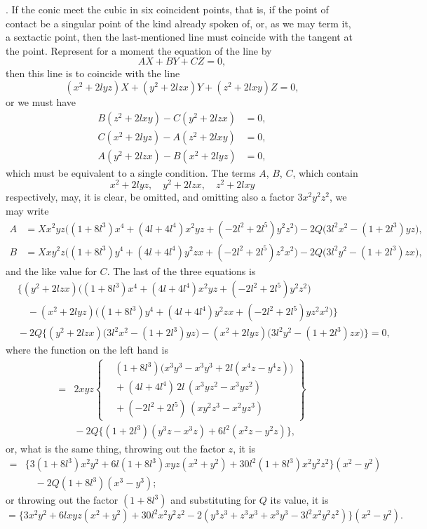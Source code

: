\documentclass[11pt]{article}
\begin{document}
. If the conic meet the cubic in six coincident points, that is, if the point of contact be a singular point of the kind already spoken of, or, as we may term it, a sextactic point, then the last-mentioned line must coincide with the tangent at the point. Represent for a moment the equation of the line by
\[
AX + BY + CZ = 0,
\]
then this line is to coincide with the line
\[
(x^2 + 2lyz)X + (y^2 + 2lzx)Y + (z^2 + 2lxy)Z = 0,
\]
or we must have
\[
\begin{aligned}
B(z^2 + 2lxy) - C(y^2 + 2lzx) &= 0,\\
C(x^2 + 2lyz) - A(z^2 + 2lxy) &= 0,\\
A(y^2 + 2lzx) - B(x^2 + 2lyz) &= 0,
\end{aligned}
\]
which must be equivalent to a single condition. The terms $A$, $B$, $C$, which contain
\[
x^2 + 2lyz,\quad y^2 + 2lzx,\quad z^2 + 2lxy
\]
respectively, may, it is clear, be omitted, and omitting also a factor $3x^2y^2z^2$, we may write
\[
\begin{aligned}
A &= Xx^2yz\bigl((1 + 8l^3)x^4 + (4l + 4l^4)x^2yz + (-2l^2 + 2l^5)y^2z^2\bigr) - 2Q\bigl(3l^2 x^2 - (1 + 2l^3)yz\bigr),\\
B &= Xxy^2z\bigl((1 + 8l^3)y^4 + (4l + 4l^4)y^2zx + (-2l^2 + 2l^5)z^2x^2\bigr) - 2Q\bigl(3l^2 y^2 - (1 + 2l^3)zx\bigr),
\end{aligned}
\]
and the like value for $C$. The last of the three equations is
\[
\begin{aligned}
&\bigl\{(y^2 + 2lzx)\bigl((1 + 8l^3)x^4 + (4l + 4l^4)x^2yz + (-2l^2 + 2l^5)y^2z^2\bigr)\\
&\quad{}- (x^2 + 2lyz)\bigl((1 + 8l^3)y^4 + (4l + 4l^4)y^2zx + (-2l^2 + 2l^5)yz^2 x^2\bigr)\bigr\}\\
&{}- 2Q\bigl\{(y^2 + 2lzx)\bigl(3l^2 x^2 - (1 + 2l^3)yz\bigr) - (x^2 + 2lyz)\bigl(3l^2 y^2 - (1 + 2l^3)zx\bigr)\bigr\} = 0,
\end{aligned}
\]
where the function on the left hand is
\[
\begin{aligned}
={}& 2xyz\left\{
\begin{aligned}
&(1 + 8l^3)\bigl(x^3y^3 - x^3y^3 + 2l(x^4 z - y^4 z)\bigr)\\
&{}+ (4l + 4l^4)\,2l\,(x^3 yz^2 - x^3 yz^2)\\
&{}+ (-2l^2 + 2l^5)\,(xy^2z^3 - x^2yz^3)
\end{aligned}\right\}\\
&{}- 2Q\bigl\{(1 + 2l^3)(y^3 z - x^3 z) + 6l^2(x^2 z - y^2 z)\bigr\},
\end{aligned}
\]
or, what is the same thing, throwing out the factor $z$, it is
\[
\begin{aligned}
={}& \bigl\{3(1 + 8l^3)x^2y^2 + 6l(1 + 8l^3)xyz(x^2 + y^2) + 30l^2(1 + 8l^3)x^2y^2z^2\bigr\}(x^2 - y^2)\\
&\quad{}- 2Q(1 + 8l^3)(x^3 - y^3);
\end{aligned}
\]
or throwing out the factor $(1 + 8l^3)$ and substituting for $Q$ its value, it is
\[
= \bigl\{3x^2y^2 + 6lxyz(x^2 + y^2) + 30l^2 x^2y^2z^2 - 2(y^3z^3 + z^3x^3 + x^3y^3 - 3l^2 x^2y^2z^2)\bigr\}(x^2 - y^2).
\]
\end{document}
